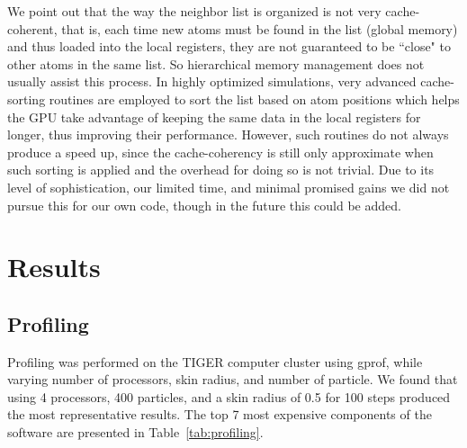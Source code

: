 \documentclass[12pt]{article}
\begin{document}
We point out that the way the neighbor list is organized is not very cache-coherent, that is, each time new atoms must be found in the list (global memory) and thus loaded into the local registers, they are not guaranteed to be ``close" to other atoms in the same list.  So hierarchical memory management does not usually assist this process.  In highly optimized simulations, very advanced cache-sorting routines are employed to sort the list based on atom positions which helps the GPU take advantage of keeping the same data in the local registers for longer, thus improving their performance.  However, such routines do not always produce a speed up, since the cache-coherency is still only approximate when such sorting is applied and the overhead for doing so is not trivial.  Due to its level of sophistication, our limited time,  and minimal promised gains we did not pursue this for our own code, though in the future this could be added.

\section{Results}

\subsection{Profiling}

Profiling was performed on the TIGER computer cluster using gprof, while varying number of processors, skin radius, and number of particle. We found that using 4 processors, 400 particles, and a skin radius of 0.5 for 100 steps produced the most representative results. The top 7 most expensive components of the software are presented in Table~\ref{tab:profiling}.
\end{document}
